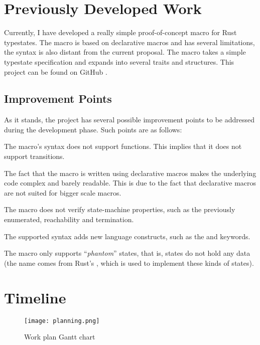 \section{Previously Developed Work}

Currently, I have developed a really simple proof-of-concept macro for Rust typestates.
The macro is based on declarative macros and has several limitations,
the syntax is also distant from the current proposal.
The macro takes a simple typestate specification and expands into several traits and structures.
This project can be found on GitHub \autocite{Duarte2020a}.

\subsection{Improvement Points}

As it stands, the project has several possible improvement points to be addressed during the development phase.
Such points are as follows:
\begin{compactitem}
    \item The macro's syntax does not support functions. This implies that it does not support transitions.
    \item The fact that the macro is written using declarative macros makes the underlying code complex and barely readable.
    This is due to the fact that declarative macros are not suited for bigger scale macros.
    \item The macro does not verify state-machine properties, such as the previously enumerated, reachability and termination.
    \item The supported syntax adds new language constructs, such as the  and  keywords.
    \item The macro only supports “\emph{phantom}” states, that is, states do not hold any data
    (the name comes from Rust's , which is used to implement these kinds of states).
\end{compactitem}

\section{Timeline}
\begin{figure}[h]
    \centering
    \texttt{[image: planning.png]}
    \caption{Work plan Gantt chart}
\end{figure}